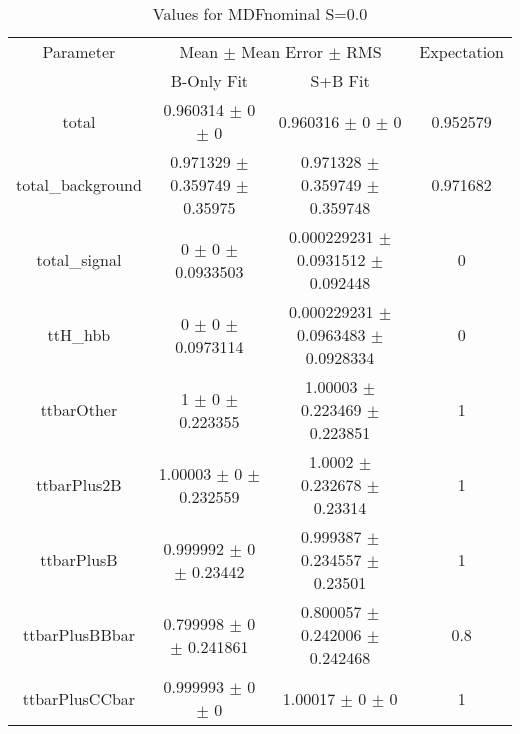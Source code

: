 \begin{table}
\centering
\caption{Values for MDFnominal S=0.0}
\begin{tabular}{cccc}
\toprule
Parameter & \multicolumn{2}{c}{Mean $\pm$ Mean Error $\pm$ RMS} & Expectation\\
 & B-Only Fit & S+B Fit & \\
\midrule
total & \num{0.960314} $\pm$ \num{0} $\pm$ \num{0} & \num{0.960316} $\pm$ \num{0} $\pm$ \num{0} & \num{0.952579}\\
total\_background & \num{0.971329} $\pm$ \num{0.359749} $\pm$ \num{0.35975} & \num{0.971328} $\pm$ \num{0.359749} $\pm$ \num{0.359748} & \num{0.971682}\\
total\_signal & \num{0} $\pm$ \num{0} $\pm$ \num{0.0933503} & \num{0.000229231} $\pm$ \num{0.0931512} $\pm$ \num{0.092448} & \num{0}\\
ttH\_hbb & \num{0} $\pm$ \num{0} $\pm$ \num{0.0973114} & \num{0.000229231} $\pm$ \num{0.0963483} $\pm$ \num{0.0928334} & \num{0}\\
ttbarOther & \num{1} $\pm$ \num{0} $\pm$ \num{0.223355} & \num{1.00003} $\pm$ \num{0.223469} $\pm$ \num{0.223851} & \num{1}\\
ttbarPlus2B & \num{1.00003} $\pm$ \num{0} $\pm$ \num{0.232559} & \num{1.0002} $\pm$ \num{0.232678} $\pm$ \num{0.23314} & \num{1}\\
ttbarPlusB & \num{0.999992} $\pm$ \num{0} $\pm$ \num{0.23442} & \num{0.999387} $\pm$ \num{0.234557} $\pm$ \num{0.23501} & \num{1}\\
ttbarPlusBBbar & \num{0.799998} $\pm$ \num{0} $\pm$ \num{0.241861} & \num{0.800057} $\pm$ \num{0.242006} $\pm$ \num{0.242468} & \num{0.8}\\
ttbarPlusCCbar & \num{0.999993} $\pm$ \num{0} $\pm$ \num{0} & \num{1.00017} $\pm$ \num{0} $\pm$ \num{0} & \num{1}\\
\bottomrule
\end{tabular}
\end{table}